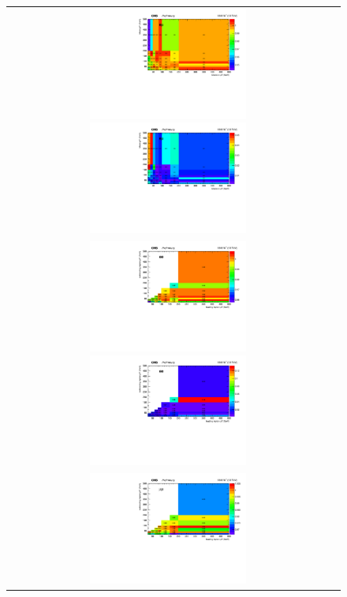 {\begin{figure}[h]
  \begin{center}
    \begin{tabular}{cc}
      \includegraphics[width=0.50\textwidth]{fig_2018_TrigSF/h2D_lepABpt_emu.pdf}
      \includegraphics[width=0.50\textwidth]{fig_2018_TrigSF/h2D_lepABpt_emu_BinErrors.pdf}\\       
      \includegraphics[width=0.50\textwidth]{fig_2018_TrigSF/h2D_lepABpt_ee.pdf}
      \includegraphics[width=0.50\textwidth]{fig_2018_TrigSF/h2D_lepABpt_ee_BinErrors.pdf}\\
      \includegraphics[width=0.50\textwidth]{fig_2018_TrigSF/h2D_lepABpt_mumu.pdf}

\end{tabular}
\end{center}
\end{figure}}
